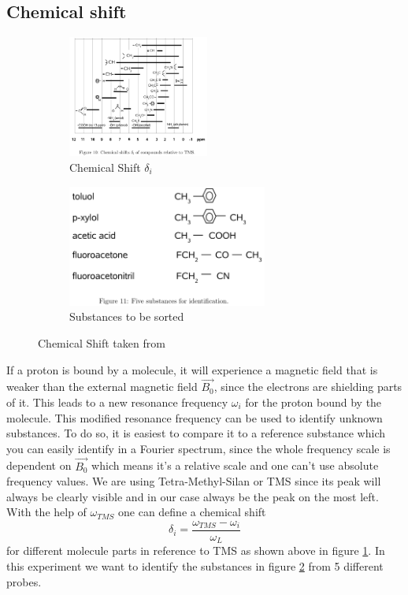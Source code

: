 \subsection{Chemical shift}\label{chemShift}
\begin{figure}[h]
	\begin{subfigure}{0.5\textwidth}
	\centering
	\includegraphics[width=0.7\linewidth ,height=4cm]{images/ChemShift.png}
	\caption{Chemical Shift $\delta_i$}
	\label{shi1}
	\end{subfigure}
	\begin{subfigure}{0.5\textwidth}
	\includegraphics[width=0.7\linewidth ,height=4cm]{images/substances.png}
	\caption{Substances to be sorted}
	\label{shi2}
	\end{subfigure}
	\caption{Chemical Shift taken from \cite{manual}}
	\label{shi3}
\end{figure}
If a proton is bound by a molecule, it will experience a magnetic field that is weaker than the external magnetic field $\vec{B_0}$, since the electrons are shielding parts of it. This leads to a new resonance frequency $\omega_i$ for the proton bound by the molecule. This modified resonance frequency can be used to identify unknown substances. To do so, it is easiest to compare it to a reference substance which you can easily identify in a Fourier spectrum, since the whole frequency scale is dependent on $\vec{B_0}$ which means it's a relative scale and one can't use absolute frequency values. We are using Tetra-Methyl-Silan or TMS since its peak will always be clearly visible and in our case always be the peak on the most left. With the help of $\omega_{TMS}$ one can define a chemical shift
\begin{equation}\label{deltashift}
	\delta_i = \frac{\omega_{TMS}-\omega_{i}}{\omega_{L}}
\end{equation} 
for different molecule parts in reference to TMS as shown above in figure \ref{shi1}. In this experiment we want to identify the substances in figure \ref{shi2} from 5 different probes. \\

